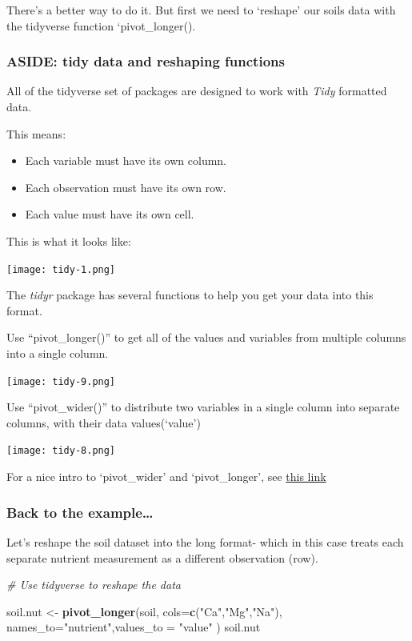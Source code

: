 \documentclass[
]{article}
\newenvironment{Shaded}{\begin{snugshade}}{\end{snugshade}}
\newcommand{\AttributeTok}[1]{\textcolor[rgb]{0.13,0.29,0.53}{#1}}
\newcommand{\CommentTok}[1]{\textcolor[rgb]{0.56,0.35,0.01}{\textit{#1}}}
\newcommand{\FunctionTok}[1]{\textcolor[rgb]{0.13,0.29,0.53}{\textbf{#1}}}
\newcommand{\NormalTok}[1]{#1}
\newcommand{\OtherTok}[1]{\textcolor[rgb]{0.56,0.35,0.01}{#1}}
\newcommand{\StringTok}[1]{\textcolor[rgb]{0.31,0.60,0.02}{#1}}
\providecommand{\tightlist}{%
  \setlength{\itemsep}{0pt}\setlength{\parskip}{0pt}}
\begin{document}
There's a better way to do it. But first we need to `reshape' our soils
data with the tidyverse function `pivot\_longer().

\hypertarget{aside-tidy-data-and-reshaping-functions}{%
\subsubsection{ASIDE: tidy data and reshaping
functions}\label{aside-tidy-data-and-reshaping-functions}}

All of the tidyverse set of packages are designed to work with
\emph{Tidy} formatted data.

This means:

\begin{itemize}
\tightlist
\item
  Each variable must have its own column.
\item
  Each observation must have its own row.
\item
  Each value must have its own cell.
\end{itemize}

This is what it looks like:

\texttt{[image: tidy-1.png]}

The \emph{tidyr} package has several functions to help you get your data
into this format.

Use ``pivot\_longer()'' to get all of the values and variables from
multiple columns into a single column.

\texttt{[image: tidy-9.png]}

Use ``pivot\_wider()'' to distribute two variables in a single column
into separate columns, with their data values(`value')

\texttt{[image: tidy-8.png]}

For a nice intro to `pivot\_wider' and `pivot\_longer', see
\href{https://tidyr.tidyverse.org/articles/pivot.html}{this link}

\hypertarget{back-to-the-example}{%
\subsubsection{Back to the example\ldots{}}\label{back-to-the-example}}

Let's reshape the soil dataset into the long format- which in this case
treats each separate nutrient measurement as a different observation
(row).

\begin{Shaded}
\begin{Highlighting}[]
\CommentTok{\# Use \textquotesingle{}tidyverse\textquotesingle{} to reshape the data }

\NormalTok{soil.nut }\OtherTok{\textless{}{-}} \FunctionTok{pivot\_longer}\NormalTok{(soil, }\AttributeTok{cols=}\FunctionTok{c}\NormalTok{(}\StringTok{"Ca"}\NormalTok{,}\StringTok{"Mg"}\NormalTok{,}\StringTok{"Na"}\NormalTok{), }\AttributeTok{names\_to=}\StringTok{"nutrient"}\NormalTok{,}\AttributeTok{values\_to =} \StringTok{"value"}\NormalTok{ )}
\NormalTok{soil.nut}
\end{Highlighting}
\end{Shaded}
\end{document}
